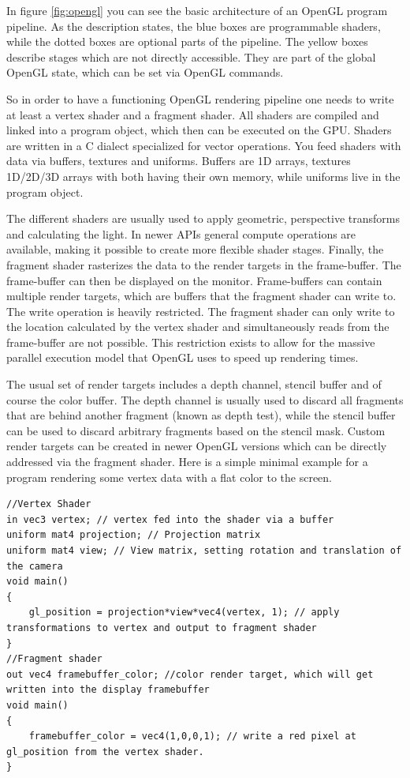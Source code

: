 In figure \ref{fig:opengl} you can see the basic architecture of an OpenGL program pipeline.
As the description states, the blue boxes are programmable shaders, while the dotted boxes are optional parts of the pipeline.
The yellow boxes describe stages which are not directly accessible. They are part of the global OpenGL state, which can be set via OpenGL commands.

So in order to have a functioning OpenGL rendering pipeline one needs to write at least a vertex shader and a fragment shader.
All shaders are compiled and linked into a program object, which then can be executed on the \ac{GPU}.
Shaders are written in a C dialect specialized for vector operations.
You feed shaders with data via buffers, textures and uniforms. Buffers are 1D arrays, textures 1D/2D/3D arrays with both having their own memory, while uniforms live in the program object.

The different shaders are usually used to apply geometric, perspective transforms and calculating the light.
In newer APIs general compute operations are available, making it possible to create more flexible shader stages.
Finally, the fragment shader rasterizes the data to the render targets in the frame-buffer.
The frame-buffer can then be displayed on the monitor.
Frame-buffers can contain multiple render targets, which are buffers that the fragment shader can write to.
The write operation is heavily restricted. The fragment shader can only write to the location calculated by the vertex shader and simultaneously reads from the frame-buffer are not possible. 
This restriction exists to allow for the massive parallel execution model that OpenGL uses to speed up rendering times.

The usual set of render targets includes a depth channel, stencil buffer and of course the color buffer.
The depth channel is usually used to discard all fragments that are behind another fragment (known as depth test), while the stencil buffer can be used to discard arbitrary fragments based on the stencil mask. 
Custom render targets can be created in newer OpenGL versions which can be directly addressed via the fragment shader.
Here is a simple minimal example for a program rendering some vertex data with a flat color to the screen.

\begin{lstlisting}
//Vertex Shader
in vec3 vertex; // vertex fed into the shader via a buffer
uniform mat4 projection; // Projection matrix
uniform mat4 view; // View matrix, setting rotation and translation of the camera
void main()
{
    gl_position = projection*view*vec4(vertex, 1); // apply transformations to vertex and output to fragment shader
}
//Fragment shader
out vec4 framebuffer_color; //color render target, which will get written into the display framebuffer
void main()
{
    framebuffer_color = vec4(1,0,0,1); // write a red pixel at gl_position from the vertex shader.
}
\end{lstlisting}

